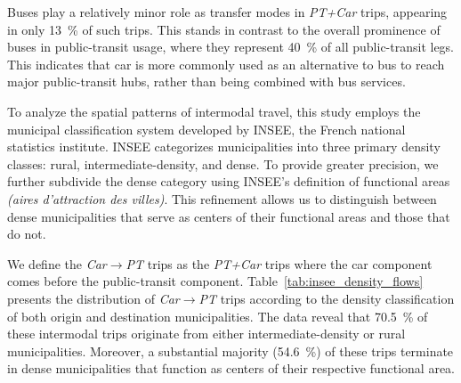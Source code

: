 \documentclass[3p,times,procedia]{elsarticle}
\begin{document}
Buses play a relatively minor role as transfer modes in \emph{PT+Car} trips, appearing in only \SI{13}{\%} of such trips.
This stands in contrast to the overall prominence of buses in public-transit usage, where they represent \SI{40}{\%} of all public-transit legs.
This indicates that car is more commonly used as an alternative to bus to reach major public-transit hubs, rather than being combined with bus services.


To analyze the spatial patterns of intermodal travel, this study employs the municipal classification system developed by INSEE, the French national statistics institute.
INSEE categorizes municipalities into three primary density classes: rural, intermediate-density, and dense.
To provide greater precision, we further subdivide the dense category using INSEE's definition of functional areas \emph{(aires d'attraction des villes)}.
This refinement allows us to distinguish between dense municipalities that serve as centers of their functional areas and those that do not.

We define the \emph{Car$\rightarrow$PT} trips as the \emph{PT+Car} trips where the car component comes before the public-transit component.
Table~\ref{tab:insee_density_flows} presents the distribution of \emph{Car$\rightarrow$PT} trips according to the density classification of both origin and destination municipalities.
The data reveal that \SI{70.5}{\%} of these intermodal trips originate from either intermediate-density or rural municipalities.
Moreover, a substantial majority (\SI{54.6}{\%}) of these trips terminate in dense municipalities that function as centers of their respective functional area.
\end{document}
